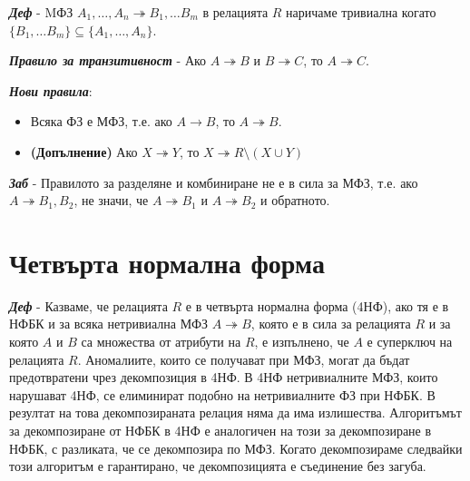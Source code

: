 \documentclass[fleqn,12pt]{article}
\begin{document}
\textbf{\textit{Деф}} - MФЗ $A_1, \dots, A_n \twoheadrightarrow B_1, \dots B_m$ в релацията $R$ наричаме тривиална когато $\{B_1, \dots B_m\} \subseteq \{A_1, \dots, A_n\}$.

\textbf{\textit{Правило за транзитивност}} - Ако $A \twoheadrightarrow B$ и $B \twoheadrightarrow C$, то $A \twoheadrightarrow C$.

\textbf{\textit{Нови правила}}:
\begin{itemize}
    \item Всяка ФЗ е МФЗ, т.е. ако $A \rightarrow B$, то $A \twoheadrightarrow B$.
    \item \textbf{(Допълнение)} Ако $X \twoheadrightarrow Y$, то $X \twoheadrightarrow R \setminus (X \cup Y)$
\end{itemize}

\textbf{\textit{Заб}} - Правилото за разделяне и комбиниране не е в сила за МФЗ, т.е. ако $A \twoheadrightarrow B_1, B_2$, не значи, че $A \twoheadrightarrow B_1$ и $A \twoheadrightarrow B_2$ и обратното.

\section{Четвърта нормална форма}

\textbf{\textit{Деф}} - Казваме, че релацията $R$ е в четвърта нормална форма (4НФ), ако тя е в НФБК и за всяка нетривиална МФЗ $A \twoheadrightarrow B$, която е в сила за релацията $R$ и за която $A$ и $B$ са множества от атрибути на $R$, е изпълнено, че $A$ е суперключ на релацията $R$.
\bigbreak
Аномалиите, които се получават при МФЗ, могат да бъдат предотвратени чрез декомпозиция в 4НФ.
В 4НФ нетривиалните МФЗ, които нарушават 4НФ, се елиминират подобно на нетривиалните ФЗ при НФБК.
В резултат на това декомпозираната релация няма да има излишества.
\bigbreak
Алгоритъмът за декомпозиране от НФБК в 4НФ е аналогичен на този за декомпозиране в НФБК, с разликата, че се декомпозира по МФЗ.
Когато декомпозираме следвайки този алгоритъм е гарантирано, че декомпозицията е съединение без загуба.
\end{document}
